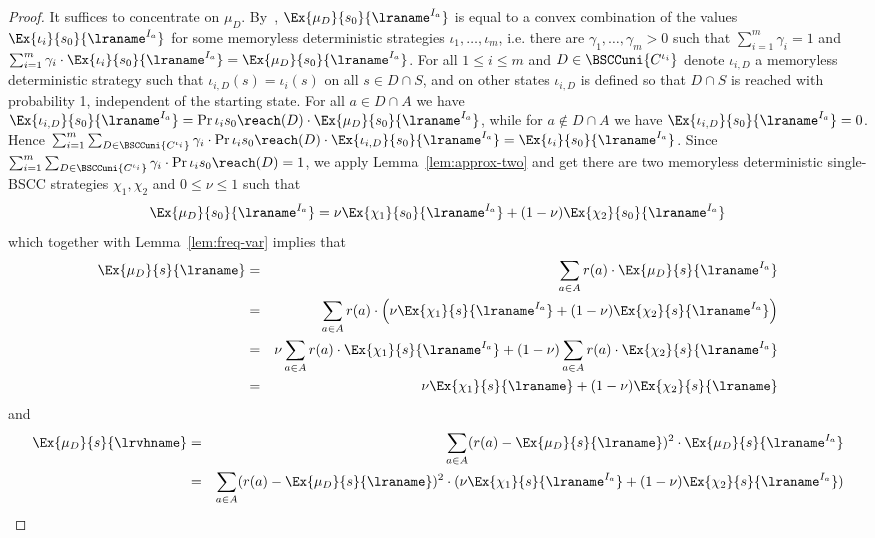 \begin{proof}
It suffices to concentrate on $\mu_D$. 
By~\cite{derman1970finite}, $\Ex{\mu_D}{s_0}{\lraname^{I_a}}$ is equal to a convex combination of the values $\Ex{\iota_i}{s_0}{\lraname^{I_a}}$ for some memoryless deterministic strategies $\iota_1,\ldots,\iota_m$, i.e. there are $\gamma_1,\ldots,\gamma_m > 0$ such that $\sum_{i=1}^m \gamma_i=1$ and $\sum_{i=1}^m \gamma_i \cdot \Ex{\iota_i}{s_0}{\lraname^{I_a}} = \Ex{\mu_D}{s_0}{\lraname^{I_a}}$.
For all $1\le i \le m$ and $D\in\BSCCuni{C^{\iota_i}}$ denote
$\iota_{i,D}$ a memoryless deterministic strategy such that $\iota_{i,D}(s)=\iota_{i}(s)$ on all $s\in D\cap S$, and on other states $\iota_{i,D}$ is defined so that
$D\cap S$ is reached with probability 1, independent of the starting state.
For all $a\in D\cap A$ we have $\Ex{\iota_{i,D}}{s_0}{\lraname^{I_a}} = \Pr{\iota_i}{s_0}{\reach(D)}\cdot \Ex{\mu_D}{s_0}{\lraname^{I_a}}$,
while for $a\not\in D\cap A$ we have $\Ex{\iota_{i,D}}{s_0}{\lraname^{I_a}} = 0$. Hence
$\sum_{i=1}^m\sum_{D\in\BSCCuni{C^{\iota_i}}} \gamma_i \cdot\Pr{\iota_i}{s_0}{\reach(D)} \cdot \Ex{\iota_{i,D}}{s_0}{\lraname^{I_a}} = \Ex{\iota_i}{s_0}{\lraname^{I_a}}$.
Since $\sum_{i=1}^m\sum_{D\in\BSCCuni{C^{\iota_i}}} \gamma_i \cdot\Pr{\iota_i}{s_0}{\reach(D)}=1$, we apply Lemma~\ref{lem:approx-two} and get
there are two memoryless deterministic single-BSCC strategies $\chi_1,\chi_2$ and $0\leq \nu\leq 1$ such that
\[
\Ex{\mu_D}{s_0}{\lraname^{I_a}}=\nu \Ex{\chi_1}{s_0}{\lraname^{I_a}}+ (1-\nu) \Ex{\chi_2}{s_0}{\lraname^{I_a}}
\]
which together with Lemma~\ref{lem:freq-var} implies that
\begin{eqnarray*}
\Ex{\mu_D}{s}{\lraname} & = & \sum_{a\in A} r(a)\cdot \Ex{\mu_D}{s}{\lraname^{I_a}} \\
  & = & \sum_{a\in A} r(a)\cdot \left(\nu \Ex{\chi_1}{s}{\lraname^{I_a}}+(1-\nu) \Ex{\chi_2}{s}{\lraname^{I_a}}\right) \\
  & = & \nu \sum_{a\in A} r(a)\cdot \Ex{\chi_1}{s}{\lraname^{I_a}} + (1-\nu)\sum_{a\in A} r(a)\cdot \Ex{\chi_2}{s}{\lraname^{I_a}} \\
  & = & \nu \Ex{\chi_1}{s}{\lraname}+(1-\nu) \Ex{\chi_2}{s}{\lraname}
\end{eqnarray*}
and
\begin{eqnarray*}
\Ex{\mu_D}{s}{\lrvhname} & = & \sum_{a\in A} (r(a)-\Ex{\mu_D}{s}{\lraname})^2\cdot \Ex{\mu_D}{s}{\lraname^{I_a}} \\
  & = & \sum_{a\in A} (r(a)-\Ex{\mu_D}{s}{\lraname})^2\cdot (\nu\Ex{\chi_1}{s}{\lraname^{I_a}}+(1-\nu)\Ex{\chi_2}{s}{\lraname^{I_a}}) \\

\end{eqnarray*}
\end{proof}
